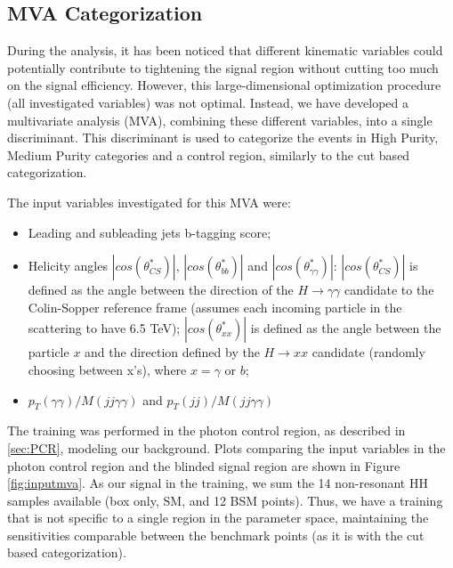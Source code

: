 \subsection{MVA Categorization}

During the analysis, it has been noticed that different kinematic variables could potentially contribute to tightening the signal region without cutting too much on the signal efficiency. 
However, this large-dimensional optimization procedure (all investigated variables) was not optimal. 
Instead, we have developed a multivariate analysis (MVA), combining these different variables, into a single discriminant. 
This discriminant is used to categorize the events in High Purity, Medium Purity categories and a control region, similarly to the cut based categorization. 

The input variables investigated for this MVA were:
\begin{itemize}
\item Leading and subleading jets b-tagging score;
\item Helicity angles $|cos(\theta^{*}_{CS})|$, $|cos(\theta^{*}_{bb})|$ and $|cos(\theta^{*}_{\gamma\gamma})|$: $|cos(\theta^{*}_{CS})|$ is defined as the angle between the direction of the $H\rightarrow\gamma\gamma$ candidate to the Colin-Sopper reference frame (assumes each incoming particle in the scattering to have 6.5 TeV); $|cos(\theta^{*}_{xx})|$ is defined as the angle between the particle $x$ and the direction defined by the $H\rightarrow x x$ candidate (randomly choosing between x's), where $x = \gamma$ or $b$;
\item $p_{T}(\gamma\gamma)/M(jj\gamma\gamma)$ and $p_{T}(jj)/M(jj\gamma\gamma)$
\end{itemize}

The training was performed in the photon control region, as described in \ref{sec:PCR}, modeling our background. 
Plots comparing the input variables in the photon control region and the blinded signal region are shown in Figure \ref{fig:inputmva}. 
As our signal in the training, we sum the 14 non-resonant HH samples available (box only, SM, and 12 BSM points). 
Thus, we have a training that is not specific to a single region in the parameter space, maintaining the sensitivities comparable between the benchmark points (as it is with the cut based categorization). 

